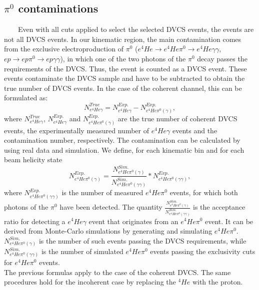 \subsection{$\pi^0$ contaminations}
~~~~Even with all cuts applied to select the selected DVCS events, the events are not all DVCS events. In our kinematic region, the main contamination comes from the exclusive electroproduction of $\pi^{0}$ ($e ^{4}He \rightarrow e ^{4}He \pi^{0} \rightarrow e ^{4}He \gamma \gamma $, $e p \rightarrow e p \pi^{0} \rightarrow e p \gamma \gamma $), in which one of the two photons of the $\pi^{0}$ decay passes the requirements of the DVCS. Thus, the event is counted as a DVCS event. These events contaminate the DVCS sample and have to be subtracted to obtain the true number of DVCS events. In the case of the coherent channel, this can be formulated as:
\begin{equation}
N^{True}_{e^{4}He\gamma} = N^{Exp.}_{e^{4}He\gamma} -  N^{Exp.}_{e^{4}He\pi^{0}(\gamma)},
\label{equ_back_1}
\end{equation} 
where $N^{True}_{e^{4}He\gamma}$, $N^{Exp.}_{e^{4}He\gamma}$ and $ N^{Exp.}_{e^{4}He\pi^{0}(\gamma)}$ are the true number of coherent DVCS events, the experimentally measured number of $e^{4}He\gamma$ events and the contamination number, respectively. The contamination can be calculated by using real data and simulation. We define, for each kinematic bin and for each beam helicity state
\begin{equation}
N^{Exp.}_{e^{4}He\pi^{0}(\gamma)} = \frac{N^{Sim.}_{e^{4}He\pi^{0}(\gamma)}}{N^{Sim.}_{e^{4}He\pi^{0}(\gamma \gamma)}} * N^{Exp.}_{e^{4}He\pi^{0}(\gamma \gamma)},
\label{equation: background_equ}
\end{equation} 
where $N^{Exp.}_{e^{4}He\pi^{0}(\gamma \gamma)}$ is the number of measured $e^{4}He\pi^{0}$ events, for which both photons of the $\pi^{0}$ have been detected. The quantity $\frac{N^{Sim.}_{e^{4}He\pi^{0}(\gamma)}}{N^{Sim.}_{e^{4}He\pi^{0}(\gamma \gamma)}} $ is the acceptance ratio for detecting a $e^{4}He\gamma$ event that originates from an $e^{4}He\pi^{0}$ event. It can be derived from Monte-Carlo simulations by generating and simulating $e^{4}He\pi^{0}$. $N^{Sim.}_{e^{4}He\pi^{0}(\gamma)}$ is the number of such events passing the DVCS requirements, while $N^{Sim.}_{e^{4}He\pi^{0}(\gamma \gamma)}$ is the number of simulated $e^{4}He\pi^{0}$ events passing the exclusivity cuts for $e^{4}He\pi^{0}$ events.\\

The previous formulas apply to the case of the coherent DVCS. The same procedures hold for the incoherent case by replacing the $^{4}He$ with the proton.\\


